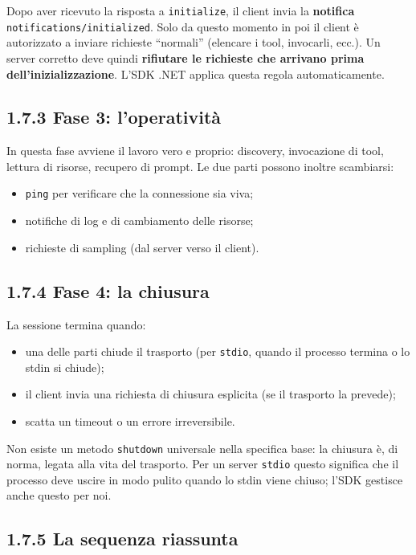 \documentclass[
  italian,
  10pt,
]{book}
\providecommand{\tightlist}{%
  \setlength{\itemsep}{0pt}\setlength{\parskip}{0pt}}
\begin{document}
Dopo aver ricevuto la risposta a \texttt{initialize}, il client invia la
\textbf{notifica} \texttt{notifications/initialized}. Solo da questo
momento in poi il client è autorizzato a inviare richieste ``normali''
(elencare i tool, invocarli, ecc.). Un server corretto deve quindi
\textbf{rifiutare le richieste che arrivano prima
dell'inizializzazione}. L'SDK .NET applica questa regola
automaticamente.

\subsection{1.7.3 Fase 3: l'operatività}\label{fase-3-loperativituxe0}

In questa fase avviene il lavoro vero e proprio: discovery, invocazione
di tool, lettura di risorse, recupero di prompt. Le due parti possono
inoltre scambiarsi:

\begin{itemize}
\tightlist
\item
  \texttt{ping} per verificare che la connessione sia viva;
\item
  notifiche di log e di cambiamento delle risorse;
\item
  richieste di sampling (dal server verso il client).
\end{itemize}

\subsection{1.7.4 Fase 4: la chiusura}\label{fase-4-la-chiusura}

La sessione termina quando:

\begin{itemize}
\tightlist
\item
  una delle parti chiude il trasporto (per \texttt{stdio}, quando il
  processo termina o lo stdin si chiude);
\item
  il client invia una richiesta di chiusura esplicita (se il trasporto
  la prevede);
\item
  scatta un timeout o un errore irreversibile.
\end{itemize}

Non esiste un metodo \texttt{shutdown} universale nella specifica base:
la chiusura è, di norma, legata alla vita del trasporto. Per un server
\texttt{stdio} questo significa che il processo deve uscire in modo
pulito quando lo stdin viene chiuso; l'SDK gestisce anche questo per
noi.

\subsection{1.7.5 La sequenza riassunta}\label{la-sequenza-riassunta}
\end{document}

